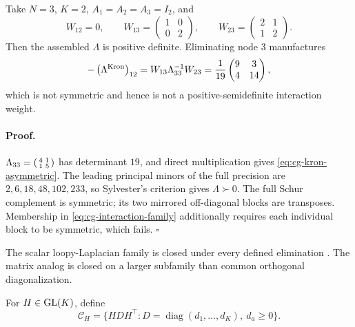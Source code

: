 Take \(N=3\), \(K=2\), \(A_1=A_2=A_3=I_2\), and
\begin{equation}
W_{12}=0,\qquad
W_{13}=\begin{pmatrix}1&0\\0&2\end{pmatrix},\qquad
W_{23}=\begin{pmatrix}2&1\\1&2\end{pmatrix}.
\label{eq:cg-kron-witness}
\end{equation}
Then the assembled \(\Lambda\) is positive definite. Eliminating node \(3\)
manufactures
\begin{equation}
-\left(\Lambda^{\rm Kron}\right)_{12}
=W_{13}\Lambda_{33}^{-1}W_{23}
=\frac1{19}\begin{pmatrix}9&3\\4&14\end{pmatrix},
\label{eq:cg-kron-asymmetric}
\end{equation}
which is not symmetric and hence is not a positive-semidefinite interaction
weight. 

\paragraph{Proof.}
\(\Lambda_{33}=\begin{psmallmatrix}4&1\\1&5\end{psmallmatrix}\) has
determinant \(19\), and direct multiplication gives
\eqref{eq:cg-kron-asymmetric}. The leading principal minors of the full
precision are \(2,6,18,48,102,233\), so Sylvester's criterion gives
\(\Lambda\succ0\). The full Schur complement is symmetric; its two mirrored
off-diagonal blocks are transposes. Membership in
\eqref{eq:cg-interaction-family} additionally requires each individual block
to be symmetric, which fails. \(\square\)

The scalar loopy-Laplacian family is closed under every defined elimination
\citep{DorflerBullo2013Kron}. The matrix analog is closed on a larger
subfamily than common orthogonal diagonalization.

For \(H\in\mathrm{GL}(K)\), define
\begin{equation}
\mathcal C_H
=\{HDH^\top:D=\operatorname{diag}(d_1,\ldots,d_K),\ d_a\geq0\}.
\label{eq:cg-congruence-diagonal-cone}
\end{equation}

